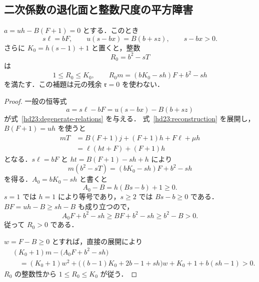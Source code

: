 \subsection{二次係数の退化面と整数尺度の平方障害}

\begin{lemma}[退化面における有界整数]
\label{hd23:degenerate-integer}
$a=uh-B(F+1)=0$ とする．このとき
\begin{equation}\label{hd23:degenerate-relations}
 s\ell=bF,\qquad u(s-bx)=B(b+sz),\qquad s-bx>0.
\end{equation}
さらに $K_0=h(s-1)+1$ と置くと，整数
\[
 R_0=b^2-sT
\]
は
\begin{equation}\label{hd23:degenerate-bound}
 1\le R_0\le K_0,\qquad
 R_0m=(bK_0-sh)F+b^2-sh
\end{equation}
を満たす．この補題は元の残余 $\mathfrak r=0$ を使わない．
\end{lemma}

\begin{proof}
一般の恒等式
\[
 a=s\ell-bF=u(s-bx)-B(b+sz)
\]
が式~\eqref{hd23:degenerate-relations} を与える．
式~\eqref{hd23:reconstruction} を展開し，$B(F+1)=uh$ を使うと
\[
 \begin{aligned}
 mT&=B(F+1)j+(F+1)h+F\ell+\mu h\\
   &=\ell(ht+F)+(F+1)h
 \end{aligned}
\]
となる．$s\ell=bF$ と $ht=B(F+1)-sh+h$ により
\[
 m(b^2-sT)=(bK_0-sh)F+b^2-sh
\]
を得る．$A_0=bK_0-sh$ と書くと
\[
 A_0-B=h(Bs-b)+1\ge0.
\]
$s=1$ では $h=1$ により等号であり，$s\ge2$ では $Bs-b\ge0$ である．
$BF=uh-B\ge sh-B$ も成り立つので，
\[
 A_0F+b^2-sh\ge BF+b^2-sh\ge b^2-B>0.
\]
従って $R_0>0$ である．

$w=F-B\ge0$ とすれば，直接の展開により
\begin{equation}\label{hd23:degenerate-upper-gap}
 \begin{aligned}
 &(K_0+1)m-\bigl(A_0F+b^2-sh\bigr)\\
 &\quad=(K_0+1)w^2+
 \bigl((b-1)K_0+2b-1+sh\bigr)w+K_0+1+b(sh-1)>0.
 \end{aligned}
\end{equation}
$R_0$ の整数性から $1\le R_0\le K_0$ が従う．
\end{proof}

